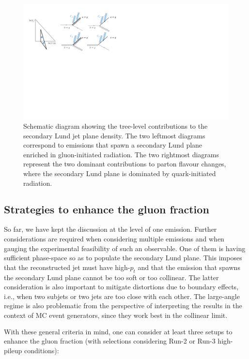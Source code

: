 \documentclass[a4paper,11pt]{article}
\begin{document}
\begin{figure}
    \centering
    \includegraphics[width = 1\textwidth]{secondary_sketch.pdf}
    \caption{Schematic diagram showing the tree-level contributions to the secondary Lund jet plane density. The two leftmost diagrams correspond to emissions that spawn a secondary Lund plane enriched in gluon-initiated radiation. The two rightmost diagrams represent the two dominant contributions to parton flavour changes, where the secondary Lund plane is dominated by quark-initiated radiation.}
    \label{fig:gluonVsQuarkParisi}
\end{figure}

\subsection{Strategies to enhance the gluon fraction}
\label{sec:enhance-gfrac}

So far, we have kept the discussion at the level of one emission. Further considerations are required when considering multiple emissions and when gauging the experimental feasibility of such an observable. One of them is having sufficient phase-space so as to populate the secondary Lund plane. This imposes that the reconstructed jet must have  high-$p_t$ and that the emission that spawns the secondary Lund plane cannot be too soft or too collinear. The latter consideration is also important to mitigate distortions due to boundary effects, i.e., when two subjets or two jets are too close with each other. The large-angle regime is also problematic from the perspective of interpreting the results in the context of MC event generators, since they work best in the collinear limit. 

With these general criteria in mind, one can consider at least three setups to enhance the gluon fraction (with selections considering Run-2 or Run-3 high-pileup conditions):
\end{document}

